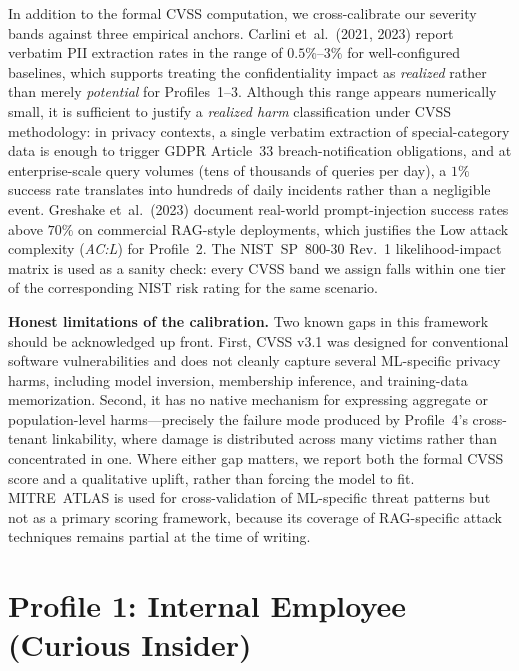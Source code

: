 \documentclass[a4paper,12pt]{report}
\begin{document}
In addition to the formal CVSS computation, we cross-calibrate our
severity bands against three empirical anchors. Carlini et~al.\ (2021,
2023) report verbatim PII extraction rates in the range of
$0.5\%$--$3\%$ for well-configured baselines, which supports treating the
confidentiality impact as \emph{realized} rather than merely
\emph{potential} for Profiles~1--3. Although this range appears
numerically small, it is sufficient to justify a \emph{realized harm}
classification under CVSS methodology: in privacy contexts, a single
verbatim extraction of special-category data is enough to trigger GDPR
Article~33 breach-notification obligations, and at enterprise-scale
query volumes (tens of thousands of queries per day), a $1\%$ success
rate translates into hundreds of daily incidents rather than a
negligible event. Greshake et~al.\ (2023) document real-world
prompt-injection success rates above $70\%$ on commercial RAG-style
deployments, which justifies the Low attack complexity (\emph{AC:L})
for Profile~2. The NIST~SP~800-30 Rev.~1 likelihood-impact matrix is
used as a sanity check: every CVSS band we assign falls within one
tier of the corresponding NIST risk rating for the same scenario.

\begin{limitbox}
\small\textbf{Honest limitations of the calibration.} Two known gaps
in this framework should be acknowledged up front. First, CVSS v3.1
was designed for conventional software vulnerabilities and does not
cleanly capture several ML-specific privacy harms, including model
inversion, membership inference, and training-data memorization.
Second, it has no native mechanism for expressing aggregate or
population-level harms---precisely the failure mode produced by
Profile~4's cross-tenant linkability, where damage is distributed
across many victims rather than concentrated in one. Where either gap
matters, we report both the formal CVSS score and a qualitative
uplift, rather than forcing the model to fit. MITRE~ATLAS is used for
cross-validation of ML-specific threat patterns but not as a primary
scoring framework, because its coverage of RAG-specific attack
techniques remains partial at the time of writing.
\end{limitbox}


\newpage
\section{Profile 1: Internal Employee (Curious Insider)}
\end{document}
